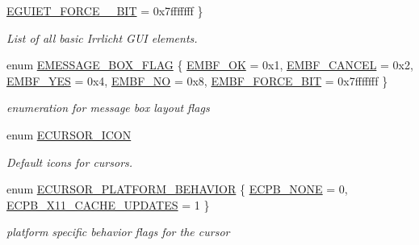 \begin{DoxyCompactItemize}
\hyperlink{namespaceirr_1_1gui_ae4d66df0ecf4117cdbcf9f22404bd254ab8bee5b306a4388ade66f347e1ec6716}{E\+G\+U\+I\+E\+T\+\_\+\+F\+O\+R\+C\+E\+\_\+\_\+\+B\+IT} = 0x7fffffff
 \}\begin{DoxyCompactList}\small\item\em List of all basic Irrlicht G\+UI elements. \end{DoxyCompactList}
\item 
enum \hyperlink{namespaceirr_1_1gui_af55112e55731c9ad1b9fe9b372c521af}{E\+M\+E\+S\+S\+A\+G\+E\+\_\+\+B\+O\+X\+\_\+\+F\+L\+AG} \{ \newline
\hyperlink{namespaceirr_1_1gui_af55112e55731c9ad1b9fe9b372c521afaa3ffecf59885ff91a925aa3e27269db9}{E\+M\+B\+F\+\_\+\+OK} = 0x1, 
\hyperlink{namespaceirr_1_1gui_af55112e55731c9ad1b9fe9b372c521afac80eabf615185a8be076b603b524cbd9}{E\+M\+B\+F\+\_\+\+C\+A\+N\+C\+EL} = 0x2, 
\hyperlink{namespaceirr_1_1gui_af55112e55731c9ad1b9fe9b372c521afa3f189c73d06ffaa58ccd6aae9e20bf6c}{E\+M\+B\+F\+\_\+\+Y\+ES} = 0x4, 
\hyperlink{namespaceirr_1_1gui_af55112e55731c9ad1b9fe9b372c521afab5c1b67792947d331d65893b4e32fcfa}{E\+M\+B\+F\+\_\+\+NO} = 0x8, 
\newline
\hyperlink{namespaceirr_1_1gui_af55112e55731c9ad1b9fe9b372c521afa8090e2700bd4ba177b400d608382df95}{E\+M\+B\+F\+\_\+\+F\+O\+R\+C\+E\+\_\+B\+IT} = 0x7fffffff
 \}\begin{DoxyCompactList}\small\item\em enumeration for message box layout flags \end{DoxyCompactList}
\item 
\mbox{\label{namespaceirr_1_1gui_aefee802dd632c5735703e40ef40f879b}} 
enum \hyperlink{namespaceirr_1_1gui_aefee802dd632c5735703e40ef40f879b}{E\+C\+U\+R\+S\+O\+R\+\_\+\+I\+C\+ON} \begin{DoxyCompactList}\small\item\em Default icons for cursors. \end{DoxyCompactList}
\item 
enum \hyperlink{namespaceirr_1_1gui_abbd186f9cfba2f805d98248df226acef}{E\+C\+U\+R\+S\+O\+R\+\_\+\+P\+L\+A\+T\+F\+O\+R\+M\+\_\+\+B\+E\+H\+A\+V\+I\+OR} \{ \hyperlink{namespaceirr_1_1gui_abbd186f9cfba2f805d98248df226acefaea42899f7236957b21660fd74dda283d}{E\+C\+P\+B\+\_\+\+N\+O\+NE} = 0, 
\hyperlink{namespaceirr_1_1gui_abbd186f9cfba2f805d98248df226acefa462d7a82478e4b89a31c15fdb20bd16e}{E\+C\+P\+B\+\_\+\+X11\+\_\+\+C\+A\+C\+H\+E\+\_\+\+U\+P\+D\+A\+T\+ES} = 1
 \}\begin{DoxyCompactList}\small\item\em platform specific behavior flags for the cursor \end{DoxyCompactList}

\end{DoxyCompactItemize}

